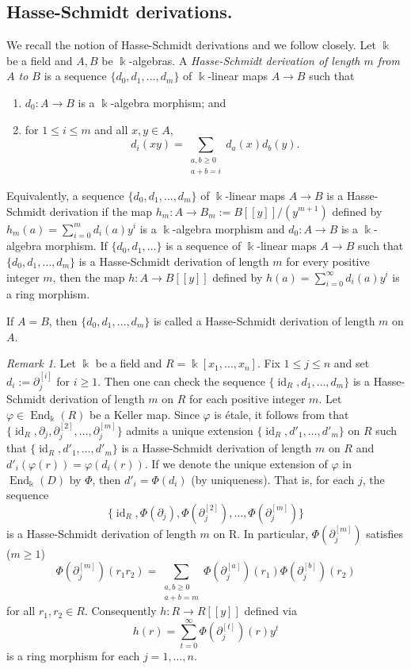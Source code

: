 \documentclass[11pt]{amsart}
\theoremstyle{definition}
\theoremstyle{remark}
\newtheorem{remark}[theorem]{Remark}
\numberwithin{equation}{subsection}
\DeclareMathOperator{\id}{id}
\DeclareMathOperator{\kk}{\Bbbk}
\DeclareMathOperator{\End}{End}
\begin{document}
\subsection{Hasse-Schmidt derivations.} We recall the notion of Hasse-Schmidt derivations and we follow \cite[\S27]{Matsumura} closely. Let $\kk$ be a field and $A,B$ be $\kk$-algebras. A \emph{Hasse-Schmidt derivation of length $m$ from $A$ to $B$} is a sequence $\{d_0,d_1,\dots,d_m\}$ of $\kk$-linear maps $A\to B$ such that
\begin{enumerate}
\item $d_0:A\to B$ is a $\kk$-algebra morphism; and
\item for $1\leq i\leq m$ and all $x,y\in A$,
\[d_i(xy)=\sum_{\substack{a,b\geq 0\\a+b=i}} d_a(x)d_b(y).\]
\end{enumerate}
Equivalently, a sequence $\{d_0,d_1,\dots,d_m\}$ of $\kk$-linear maps $A\to B$ is a Hasse-Schmidt derivation if the map $h_m:A\to B_m:=B[[y]]/(y^{m+1})$ defined by $h_m(a)=\sum_{i=0}^md_i(a)y^i$ is a $\kk$-algebra morphism and $d_0:A\to B$ is a $\kk$-algebra morphism. If $\{d_0,d_1,\dots\}$ is a sequence of $\kk$-linear maps $A\to B$ such that $\{d_0,d_1,\dots,d_m\}$ is a Hasse-Schmidt derivation of length $m$ for every positive integer $m$, then the map $h:A\to B[[y]]$ defined by $h(a)=\sum_{i=0}^{\infty} d_i(a)y^i$ is a ring morphism.

If $A=B$, then $\{d_0,d_1,\dots,d_m\}$ is called a Hasse-Schmidt derivation of length $m$ on $A$.

\begin{remark}
\label{image of Keller is HS}
Let $\kk$ be a field and $R=\kk[x_1,\dots,x_n]$. Fix $1\leq j\leq n$ and set $d_i:=\partial^{[i]}_j$ for $i\geq 1$. Then one can check the sequence $\{\id_R, d_1,\dots, d_m\}$ is a Hasse-Schmidt derivation of length $m$ on $R$ for each positive integer $m$. Let $\varphi\in \End_{\kk}(R)$ be a Keller map. Since $\varphi$ is \'{e}tale, it follows from \cite[Theorem 27.2]{Matsumura} that $\{\id_R, \partial_j,\partial_j^{[2]},\dots, \partial_j^{[m]}\}$ admits a unique extension $\{\id_R, d'_1,\dots, d'_m\}$ on $R$ such that $\{\id_R, d'_1,\dots, d'_m\}$ is a Hasse-Schmidt derivation of length $m$ on $R$ and $d'_i(\varphi(r))=\varphi(d_i(r))$. If we denote the unique extension of $\varphi$ in $\End_{\kk}(D)$ by $\Phi$, then $d'_i=\Phi(d_i)$ (by uniqueness). That is, for each $j$, the sequence 
\[\{\id_R, \Phi(\partial_j),\Phi(\partial_j^{[2]}),\dots,\Phi(\partial^{[m]}_j)\}\] 
is a Hasse-Schmidt derivation of length $m$ on R. In particular, $\Phi(\partial^{[m]}_j)$ satisfies ($m\geq 1$)
\[\Phi(\partial^{[m]}_j)(r_1r_2)=\sum_{\substack{a,b\geq 0\\a+b=m}} \Phi(\partial^{[a]}_j)(r_1)\Phi(\partial^{[b]}_j)(r_2)\]
for all $r_1,r_2\in R$. Consequently $h:R\to R[[y]]$ defined via
\[h(r)=\sum_{t=0}^{\infty} \Phi(\partial^{[t]}_j)(r)y^t\]
is a ring morphism for each $j=1,\dots,n$. 
\end{remark}
\end{document}
